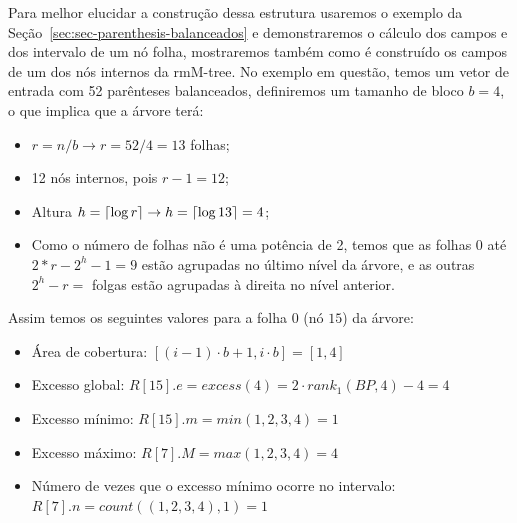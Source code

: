 \begin{example}\label{ex-build-tree}
    Para melhor elucidar a construção dessa estrutura usaremos o exemplo da Seção~\ref{sec:sec-parenthesis-balanceados} e demonstraremos o cálculo dos campos e dos intervalo de um nó folha, 
    mostraremos também como é construído os campos de  um dos nós internos da rmM-tree. No exemplo em questão, temos um vetor de entrada com 52 parênteses balanceados, 
    definiremos um tamanho de bloco $b=4$, o que implica que a árvore terá:

    \begin{itemize}
        \item $r = n/b \to r = 52/4 = 13 $ folhas;
        \item 12 nós internos, pois $r-1 = 12$;
        \item Altura $h= \lceil\log r\rceil \to h = \lceil\log 13\rceil= 4$;
        \item Como o número de folhas não é uma potência de 2, temos que as folhas $0$ até $2*r - 2^h  -1 = 9$ estão agrupadas no último nível da árvore,  e as outras $2^h - r = $ folgas estão agrupadas à
        direita no nível anterior.
    \end{itemize}

    Assim temos os seguintes valores para a folha $0$ (nó $15$) da árvore:
        \begin{itemize}
            \item  Área de cobertura:
            $ [(i-1)\cdot b +1, i\cdot b] = [1,4]$
            \item Excesso global:
            $R[15].e = excess(4) = 2 \cdot rank_1(BP,4) - 4 = 4 
            $
            \item Excesso mínimo:
            $R[15].m = min(1,2,3,4) = 1$
            \item Excesso máximo:
            $R[7].M = max(1,2,3,4) = 4$
            \item Número de vezes que o excesso mínimo ocorre no intervalo:\\
            $R[7].n = count((1,2,3,4),1) = 1$
        \end{itemize}
        

\end{example}
